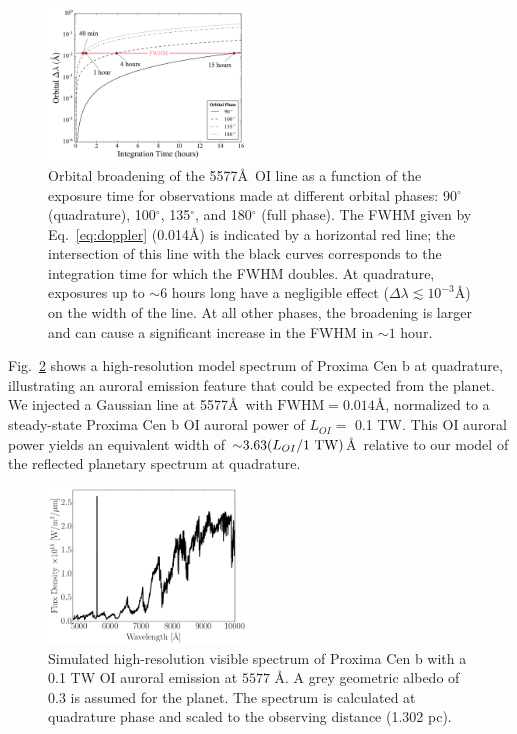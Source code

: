 \documentclass{emulateapj}
\begin{document}
\begin{figure}[bt]
\includegraphics[width=0.47\textwidth]{orbital_broadening.pdf}
\caption{Orbital broadening of the 5577\AA\ OI line as a function of the exposure time for observations made at different orbital phases: 90$^\circ$ (quadrature), 100$^\circ$, 135$^\circ$, and 180$^\circ$ (full phase). The FWHM given by Eq.~\ref{eq:doppler} (0.014\AA) is indicated by a horizontal red line; the intersection of this line with the black curves corresponds to the integration time for which the FWHM doubles. At quadrature, exposures up to ${\sim} 6$ hours long have a negligible effect ($\Delta\lambda \lesssim 10^{-3}$\AA) on the width of the line. At all other phases, the broadening is larger and can cause a significant increase in the FWHM in ${\sim} 1$ hour.\\[0in]}
\label{fig:orbital_broadening}
\end{figure}

Fig.~\ref{fig:spec} shows a high-resolution model spectrum of Proxima Cen b at quadrature, illustrating an auroral emission feature that could be expected from the planet. We injected a Gaussian line at 5577\AA\ with $\text{FWHM} = 0.014$\AA, normalized to a steady-state Proxima Cen b OI auroral power of $L_{OI} = $ 0.1 TW. This OI auroral power yields an equivalent width of ${\sim} 3.63 (L_{OI}/1 {\rm \ TW})$\AA\ relative to our model of the reflected planetary spectrum at quadrature.

\begin{figure}[bt]
\includegraphics[width=0.47\textwidth]{OI_ref_spec.pdf}
\caption{Simulated high-resolution visible spectrum of Proxima Cen b with a 0.1 TW OI auroral emission at $5577$ \AA. A grey geometric albedo of 0.3 is assumed for the planet. The spectrum is calculated at quadrature phase and scaled to the observing distance (1.302 pc).}
\label{fig:spec}
\end{figure}
\end{document}
